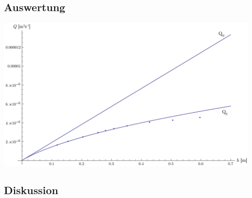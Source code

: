 \documentclass[12pt,a4paper]{article}
\begin{document}
\subsection*{Auswertung}
\begin{center}
\includegraphics[width=15cm]{diagram5.pdf}
\end{center}

\subsection*{Diskussion}
\end{document}

